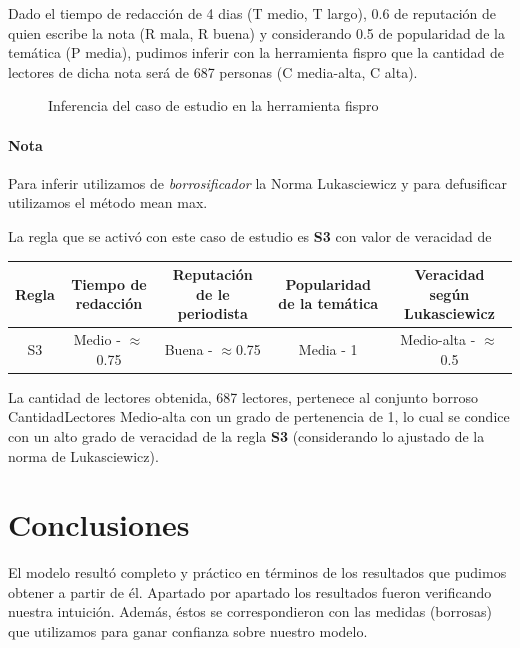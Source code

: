 \documentclass{article}
\begin{document}
\begin{itemize}
Dado el tiempo de redacción de 4 dias (T medio, T largo), 0.6 de reputación de quien escribe la nota (R mala, R buena) y considerando 0.5 de popularidad de la temática (P media), pudimos inferir con la herramienta fispro que la cantidad de lectores de dicha nota será de 687 personas (C media-alta, C alta).

\begin{figure}[H]
	\centering
	\caption{Inferencia del caso de estudio en la herramienta fispro}
\end{figure}

\paragraph{Nota} Para inferir utilizamos de \textit{borrosificador} la Norma Lukasciewicz
y para defusificar utilizamos el método mean max.

\vspace{3mm}
La regla que se activó con este caso de estudio es \textbf{S3} con valor de veracidad de

\begin{table}[H]
	\centering
	\begin{tabular}{c|c c c|c}
		Regla&Tiempo de redacción&Reputación de le periodista&Popularidad de la temática&Veracidad según Lukasciewicz\\
		\hline
		S3&Medio - $\approx$0.75&Buena - $\approx$0.75&Media - 1&Medio-alta - $\approx$0.5\footnotemark\\
	\end{tabular}
\end{table}


La cantidad de lectores obtenida, 687 lectores, pertenece al conjunto borroso CantidadLectores Medio-alta con un grado de pertenencia de 1, lo cual se condice con un alto grado de veracidad de la regla \textbf{S3} (considerando lo ajustado de la norma de Lukasciewicz).

\pagebreak
\section*{Conclusiones}

El modelo resultó completo y práctico en términos de los resultados que pudimos obtener a partir de él. Apartado por apartado los resultados fueron verificando nuestra intuición. Además, éstos se correspondieron con las medidas (borrosas) que utilizamos para ganar confianza sobre nuestro modelo.


\end{itemize}
\end{document}
